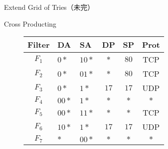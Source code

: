 \documentclass[12pt,dvipdfmx,mathserif,uplatex,aspectratio=32]{beamer}
\makeatletter
\newcommand{\tblcaption}[1]{\def\@captype{table}\caption{#1}}
\makeatother
\begin{document}
\begin{frame}{Extend Grid of Tries（未完）}

 \begin{figure}
  {\centering
  \scalebox{0.6}{}

  }
 \end{figure}

\end{frame}


\begin{frame}{Cross Producting}

\begin{figure}[h]
 \def\@captype{table}
 \begin{minipage}[t]{.5\textwidth}
  {\scriptsize
  {\centering
  \begin{tabular}{c|l|l|c|c|c} 
   Filter   & DA      & SA     & DP     & SP     & Prot \\ \hline
   $F_{1} $ & $0*$    & $10*$  & $*$    & $80$   & TCP  \\ \hline
   $F_{2} $ & $0*$    & $01*$  & $*$    & $80$   & TCP  \\ \hline
   $F_{3} $ & $0*$    & $1*$   & $17$   & $17$   & UDP \\ \hline
   $F_{4} $ & $00*$   & $1*$   & $*$    & $*$    & $*$ \\ \hline
   $F_{5} $ & $00*$   & $11*$  & $*$    & $*$    & TCP \\ \hline
   $F_{6} $ & $10*$   & $1*$   & $17$   & $17$   & UDP \\ \hline
   $F_{7} $ & $*$     & $00*$  & $*$    & $*$    & $*$
  \end{tabular}

}}
\end{minipage}
\end{figure}
\end{frame}
\end{document}

